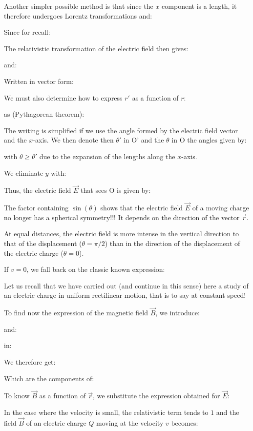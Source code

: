 	Another simpler possible method is that since the $x$ component is a length, it therefore undergoes Lorentz transformations and:
	
	Since for recall:
	
	The relativistic transformation of the electric field then gives:
	
	and:
	
	Written in vector form:
	
	We must also determine how to express $r'$ as a function of $r$:
	
	as (Pythagorean theorem):
	
	The writing is simplified if we use the angle formed by the electric field vector and the $x$-axis. We then denote then $\theta'$ in O' and the $\theta$ in O the angles given by:
	
	with $\theta\geq \theta'$ due to the expansion of the lengths along the $x$-axis.

	We eliminate $y$ with:
	
	Thus, the electric field $\vec{E}$ that sees O is given by:
	
	The factor containing $\sin(\theta)$ shows that the electric field $\vec{E}$ of a moving charge no longer has a spherical symmetry!!! It depends on the direction of the vector $\vec{r}$.

	At equal distances, the electric field is more intense in the vertical direction to that of the displacement ($\theta=\pi/2$) than in the direction of the displacement of the electric charge ($\theta=0$).

	If $v = 0$, we fall back on the classic known expression:
	
	\begin{tcolorbox}[title=Remark,colframe=black,arc=10pt]
	Let us recall that we have carried out (and continue in this sense) here a study of an electric charge in uniform rectilinear motion, that is to say at constant speed!
	\end{tcolorbox}
	To find now the expression of the magnetic field $\vec{B}$, we introduce:
	
	and:
	
	in:
	
	We therefore get:
	
	Which are the components of:
	
	To know $\vec{B}$ as a function of $\vec{r}$, we substitute the expression obtained for $\vec{E}$:
	
	In the case where the velocity is small, the relativistic term tends to $1$ and the field $\vec{B}$ of an electric charge $Q$ moving at the velocity $v$ becomes:
	
